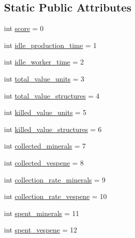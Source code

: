\subsection*{Static Public Attributes}
\begin{DoxyCompactItemize}
\item 
int \mbox{\hyperlink{classpysc2_1_1lib_1_1features_1_1_score_cumulative_ab7c3d4ffa69657e6ed9c7bf91253c298}{score}} = 0
\item 
int \mbox{\hyperlink{classpysc2_1_1lib_1_1features_1_1_score_cumulative_afa2d48ac9f680f777d23130ec2eafd38}{idle\+\_\+production\+\_\+time}} = 1
\item 
int \mbox{\hyperlink{classpysc2_1_1lib_1_1features_1_1_score_cumulative_adc2df24bc2bce110aec7d7f038d33021}{idle\+\_\+worker\+\_\+time}} = 2
\item 
int \mbox{\hyperlink{classpysc2_1_1lib_1_1features_1_1_score_cumulative_a0d0e3e2d4ab6bf8b8db97fe0d877193e}{total\+\_\+value\+\_\+units}} = 3
\item 
int \mbox{\hyperlink{classpysc2_1_1lib_1_1features_1_1_score_cumulative_a46051021c264abb824d671cf1026b208}{total\+\_\+value\+\_\+structures}} = 4
\item 
int \mbox{\hyperlink{classpysc2_1_1lib_1_1features_1_1_score_cumulative_a3c91120b1f1a78c3fd14e5fe36c27b13}{killed\+\_\+value\+\_\+units}} = 5
\item 
int \mbox{\hyperlink{classpysc2_1_1lib_1_1features_1_1_score_cumulative_a8a3f77c8f7c7a0edf265c4f8f0a9ff8c}{killed\+\_\+value\+\_\+structures}} = 6
\item 
int \mbox{\hyperlink{classpysc2_1_1lib_1_1features_1_1_score_cumulative_adc4740918132917a49dd5d712f5f3db7}{collected\+\_\+minerals}} = 7
\item 
int \mbox{\hyperlink{classpysc2_1_1lib_1_1features_1_1_score_cumulative_aa7b0fdd3500d378bbcc7d63331dbf621}{collected\+\_\+vespene}} = 8
\item 
int \mbox{\hyperlink{classpysc2_1_1lib_1_1features_1_1_score_cumulative_a0bdb39aa8bea6ce80892d7a67a7fba26}{collection\+\_\+rate\+\_\+minerals}} = 9
\item 
int \mbox{\hyperlink{classpysc2_1_1lib_1_1features_1_1_score_cumulative_a14b0f91bd0c1bb05889efe197b2997b7}{collection\+\_\+rate\+\_\+vespene}} = 10
\item 
int \mbox{\hyperlink{classpysc2_1_1lib_1_1features_1_1_score_cumulative_afe35efca534f2e62a6d59ad9a0c5cd89}{spent\+\_\+minerals}} = 11
\item 
int \mbox{\hyperlink{classpysc2_1_1lib_1_1features_1_1_score_cumulative_aafc5617676f79d6885b267ebee9b8a86}{spent\+\_\+vespene}} = 12
\end{DoxyCompactItemize}


